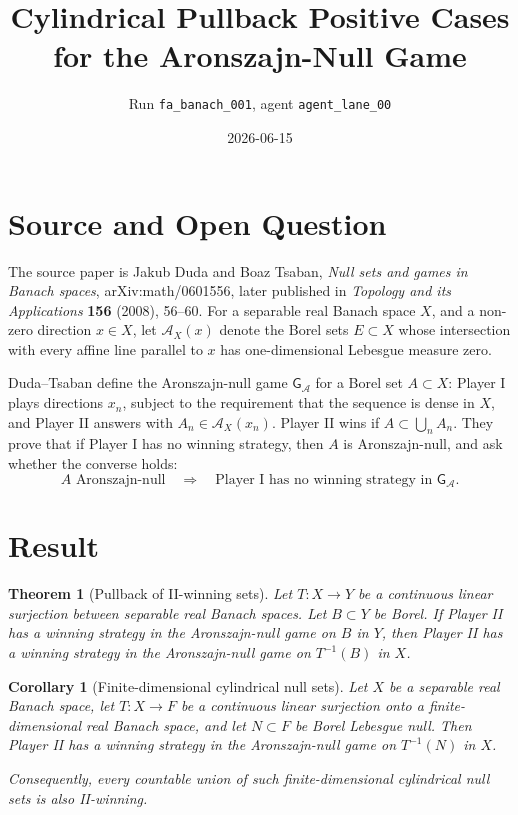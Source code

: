 \documentclass[11pt]{article}
\title{Cylindrical Pullback Positive Cases for the Aronszajn-Null Game}
\author{Run \texttt{fa\_banach\_001}, agent \texttt{agent\_lane\_00}}
\date{2026-06-15}
\newtheorem{theorem}{Theorem}
\newtheorem{corollary}{Corollary}
\newcommand{\Acal}{\mathcal A}
\newcommand{\G}{\mathsf G_{\mathcal A}}
\begin{document}
\maketitle

\section*{Source and Open Question}

The source paper is Jakub Duda and Boaz Tsaban, \emph{Null sets and games in
Banach spaces}, arXiv:math/0601556, later published in \emph{Topology and its
Applications} \textbf{156} (2008), 56--60.  For a separable real Banach space
\(X\), and a non-zero direction \(x\in X\), let \(\Acal_X(x)\) denote the
Borel sets \(E\subset X\) whose intersection with every affine line parallel
to \(x\) has one-dimensional Lebesgue measure zero.

Duda--Tsaban define the Aronszajn-null game \(\G\) for a Borel set \(A\subset
X\): Player I plays directions \(x_n\), subject to the requirement that the
sequence is dense in \(X\), and Player II answers with \(A_n\in\Acal_X(x_n)\).
Player II wins if \(A\subset\bigcup_n A_n\).  They prove that if Player I has
no winning strategy, then \(A\) is Aronszajn-null, and ask whether the
converse holds:
\[
        A \text{ Aronszajn-null}
        \quad\Longrightarrow\quad
        \text{Player I has no winning strategy in }\G.
\]

\section*{Result}

\begin{theorem}[Pullback of II-winning sets]\label{thm:pullback}
Let \(T:X\to Y\) be a continuous linear surjection between separable real
Banach spaces.  Let \(B\subset Y\) be Borel.  If Player II has a winning
strategy in the Aronszajn-null game on \(B\) in \(Y\), then Player II has a
winning strategy in the Aronszajn-null game on \(T^{-1}(B)\) in \(X\).
\end{theorem}

\begin{corollary}[Finite-dimensional cylindrical null sets]\label{cor:cyl}
Let \(X\) be a separable real Banach space, let \(T:X\to F\) be a continuous
linear surjection onto a finite-dimensional real Banach space, and let
\(N\subset F\) be Borel Lebesgue null.  Then Player II has a winning strategy
in the Aronszajn-null game on \(T^{-1}(N)\) in \(X\).

Consequently, every countable union of such finite-dimensional cylindrical
null sets is also II-winning.
\end{corollary}
\end{document}
